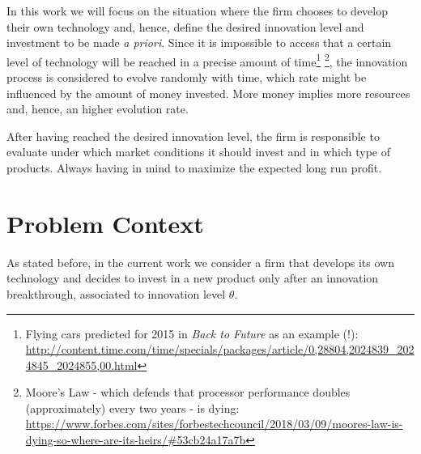 In this work we will focus on the situation where the firm chooses to develop their own technology and, hence, define the desired innovation level and investment to be made \textit{a priori}. Since it is impossible to access that a certain level of technology will be reached in a precise amount of time\footnote{Flying cars predicted for 2015 in \textit{Back to Future} as an example (!):\\ \url{http://content.time.com/time/specials/packages/article/0,28804,2024839_2024845_2024855,00.html}} \footnote{Moore's Law - which defends that processor performance doubles (approximately) every two years - is dying:\\
\url{https://www.forbes.com/sites/forbestechcouncil/2018/03/09/moores-law-is-dying-so-where-are-its-heirs/\#53cb24a17a7b}}, the innovation process is considered to evolve randomly with time, which rate might be influenced by the amount of money invested. More money implies more resources and, hence, an higher evolution rate.

After having reached the desired innovation level, the firm is responsible to evaluate under which market conditions it should invest and in which type of products. Always having in mind to maximize the expected long run profit.




\section{Problem Context}
\label{section:context}

As stated before, in the current work we consider a firm that develops its own technology and decides to invest in a new product only after an innovation breakthrough, associated to innovation level $\theta$.

